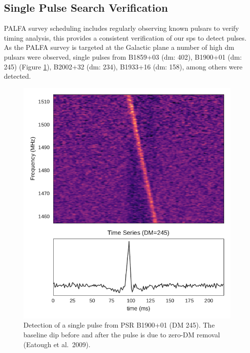 \documentclass[a4paper,fleqn,usenatbib]{mnras}
\begin{document}
\subsection{Single Pulse Search Verification}
\label{sec:system_verify}

PALFA survey scheduling includes regularly observing known pulsars to verify
timing analysis, this provides a consistent verification of our \gls{sps} to
detect pulses. As the PALFA survey is targeted at the Galactic plane a number of
high \gls{dm} pulsars were observed, single pulses from B1859+03 (\gls{dm}:
402), B1900+01 (\gls{dm}: 245) (Figure \ref{fig:B1900}), B2002+32 (\gls{dm}:
234), B1933+16 (\gls{dm}: 158), among others were detected.


\begin{figure}
    \includegraphics[width=1.0\linewidth]{figures/B1900_01.pdf}
    \caption{Detection of a single pulse from PSR B1900+01 (DM 245). The
    baseline dip before and after the pulse is due to zero-DM removal (Eatough
    et al.~2009). }
    \label{fig:B1900}
\end{figure}
\end{document}
